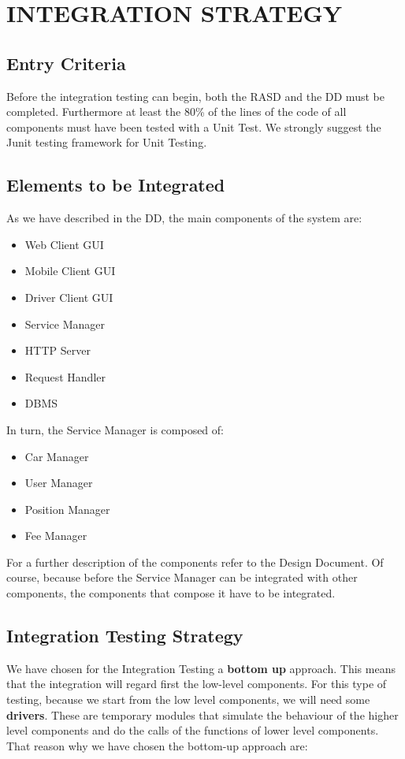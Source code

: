 \section{INTEGRATION STRATEGY}
\subsection{Entry Criteria} 
Before the integration testing can begin, both the RASD and the DD must be completed. Furthermore at least the 80\% of the lines of the code of all components must have been tested with a Unit Test. We strongly suggest the Junit testing framework for Unit Testing.
\subsection{Elements to be Integrated} 
As we have described in the DD, the main components of the system are:
\begin{itemize}
\item Web Client GUI
\item Mobile Client GUI
\item Driver Client GUI
\item Service Manager 
\item HTTP Server
\item Request Handler
\item DBMS
\end{itemize}

In turn, the Service Manager is composed of:
\begin{itemize}
\item Car Manager
\item User Manager
\item Position Manager
\item Fee Manager
\end{itemize}
\noindent
For a further description of the components refer to the Design Document. 
\newline 
Of course, because before the Service Manager can be integrated with other components, the components that compose it have to be integrated.


\subsection{Integration Testing Strategy} 

We have chosen for the Integration Testing a \textbf{bottom up} approach. This means that the integration will regard first the low-level components. For this type of testing, because we start from the low level components, we will need some \textbf{drivers}. These are temporary modules that simulate the behaviour of the higher level components and do the calls of the functions of lower level components. \newline
That reason why we have chosen the bottom-up approach are:

